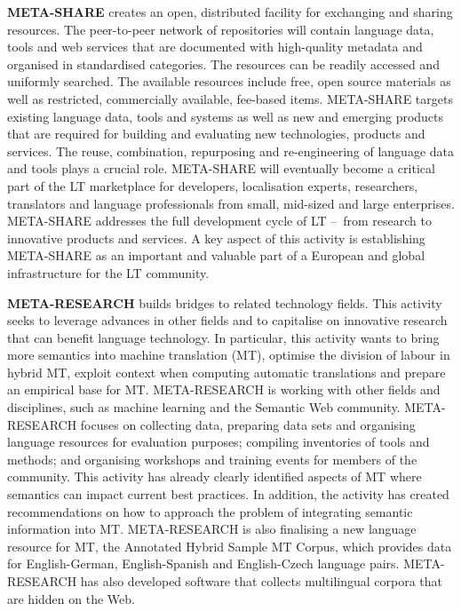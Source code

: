 \begin{multicols}{2}
\textbf{META-SHARE} creates an open, distributed facility for exchanging and sharing resources. The peer-to-peer network of repositories will contain language data, tools and web services that are documented with high-quality metadata and organised in standardised categories. The resources can be readily accessed and uniformly searched. The available resources include free, open source materials as well as restricted, commercially available, fee-based items. META-SHARE targets existing language data, tools and systems as well as new and emerging products that are required for building and evaluating new technologies, products and services. The reuse, combination, repurposing and re-engineering of language data and tools plays a crucial role. META-SHARE will eventually become a critical part of the LT marketplace for developers, localisation experts, researchers, translators and language professionals from small, mid-sized and large enterprises. META-SHARE addresses the full development cycle of LT --~from research to innovative products and services. A key aspect of this activity is establishing META-SHARE as an important and valuable part of a European and global infrastructure for the LT community. 

\textbf{META-RESEARCH} builds bridges to related technology fields. This activity seeks to leverage advances in other fields and to capitalise on innovative research that can benefit language technology. In particular, this activity wants to bring more semantics into machine translation (MT), optimise the division of labour in hybrid MT, exploit context when computing automatic translations and prepare an empirical base for MT. META-RESEARCH is working with other fields and disciplines, such as machine learning and the Semantic Web community. META-RESEARCH focuses on collecting data, preparing data sets and organising language resources for evaluation purposes; compiling inventories of tools and methods; and organising workshops and training events for members of the community. This activity has already clearly identified aspects of MT where semantics can impact current best practices. In addition, the activity has created recommendations on how to approach the problem of integrating semantic information into MT. META-RESEARCH is also finalising a new language resource for MT, the Annotated Hybrid Sample MT Corpus, which provides data for English-German, English-Spanish and English-Czech language pairs. META-RESEARCH has also developed software that collects multilingual corpora that are hidden on the Web.
\end{multicols}

